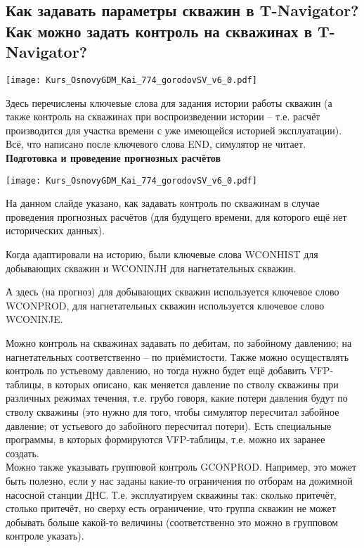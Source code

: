 

\subsection{Как задавать параметры скважин в T-Navigator? Как можно задать контроль на скважинах в T-Navigator?}

\texttt{[image: Kurs\_OsnovyGDM\_Kai\_774\_gorodovSV\_v6\_0.pdf]}

Здесь перечислены ключевые слова для задания истории работы скважин (а также контроль на скважинах при воспроизведении истории -- т.е. расчёт производится для участка времени с уже имеющейся историей эксплуатации).
\\

Всё, что написано после ключевого слова END, симулятор не читает.
\\

\textbf{Подготовка и проведение прогнозных расчётов}

\texttt{[image: Kurs\_OsnovyGDM\_Kai\_774\_gorodovSV\_v6\_0.pdf]}

На данном слайде указано, как задавать контроль по скважинам в случае проведения прогнозных расчётов (для будущего времени, для которого ещё нет исторических данных).

Когда адаптировали на историю, были ключевые слова WCONHIST для добывающих скважин и WCONINJH для нагнетательных скважин.

А здесь (на прогноз) для добывающих скважин используется ключевое слово WCONPROD, для нагнетательных скважин используется ключевое слово WCONINJE.

Можно контроль на скважинах задавать по дебитам, по забойному давлению; на нагнетательных соответственно -- по приёмистости.
Также можно осуществлять контроль по устьевому давлению, но тогда нужно будет ещё добавить VFP-таблицы, в которых описано, как меняется давление по стволу скважины при различных режимах течения, т.е. грубо говоря, какие потери давления будут по стволу скважины (это нужно для того, чтобы симулятор пересчитал забойное давление; от устьевого до забойного пересчитал потери).
Есть специальные программы, в которых формируются VFP-таблицы, т.е. можно их заранее создать.
\\

Можно также указывать групповой контроль GCONPROD.
Например, это может быть полезно, если у нас заданы какие-то ограничения по отборам на дожимной насосной станции ДНС.
Т.е. эксплуатируем скважины так: сколько притечёт, столько притечёт, но сверху есть ограничение, что группа скважин не может добывать больше какой-то величины (соответственно это можно в групповом контроле указать).

